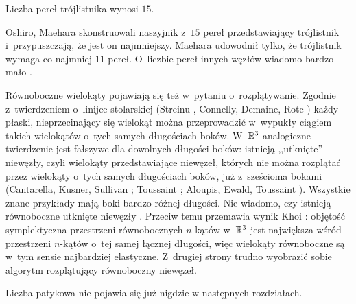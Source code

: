 \begin{conjecture}[o~15 perłach]
    Liczba pereł trójlistnika wynosi $15$.
\end{conjecture}

Oshiro, Maehara \cite{maehara1999} skonstruowali naszyjnik z~$15$ pereł przedstawiający trójlistnik i~przypuszczają, że jest on najmniejszy.
%
%
Maehara \cite{maehara2007} udowodnił tylko, że trójlistnik wymaga co najmniej $11$ pereł.
O~liczbie pereł innych węzłów wiadomo bardzo mało \cite[problem 1.73]{baykur2026}.

Równoboczne wielokąty pojawiają się też w~pytaniu o~rozplątywanie.
Zgodnie z~twierdzeniem o~linijce stolarskiej (Streinu \cite{streinu2000}, Connelly, Demaine, Rote \cite{connelly2003}) każdy płaski, nieprzecinający się wielokąt można przeprowadzić w~wypukły ciągiem takich wielokątów o~tych samych długościach boków.
%
%
%
%
W~$\mathbb R^3$ analogiczne twierdzenie jest fałszywe dla dowolnych długości boków: istnieją ,,utknięte'' niewęzły, czyli wielokąty przedstawiające niewęzeł, których nie można rozplątać przez wielokąty o~tych samych długościach boków, już z~sześcioma bokami (Cantarella, Kusner, Sullivan \cite{cantarella1998}; Toussaint \cite{toussaint2001}; Aloupis, Ewald, Toussaint \cite{aloupis2004}).
%
Wszystkie znane przykłady mają boki bardzo różnej długości.
Nie wiadomo, czy istnieją równoboczne utknięte niewęzły \cite[problem 1.72]{baykur2026}.
Przeciw temu przemawia wynik Khoi \cite{khoi2005}: objętość symplektyczna przestrzeni równobocznych $n$-kątów w~$\mathbb R^3$ jest największa wśród przestrzeni $n$-kątów o~tej samej łącznej długości, więc wielokąty równoboczne są w~tym sensie najbardziej elastyczne.
Z~drugiej strony trudno wyobrazić sobie algorytm rozplątujący równoboczny niewęzeł.


Liczba patykowa nie pojawia się już nigdzie w następnych rozdziałach.


%


